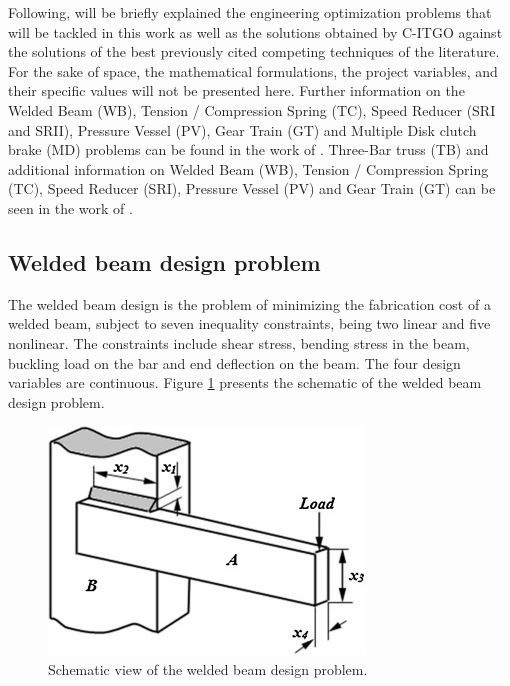 Following, will be briefly explained the engineering optimization problems that will be tackled in this work as well as the solutions obtained by C-ITGO against the solutions of the best previously cited competing techniques of the literature. For the sake of space, the mathematical formulations, the project variables, and their specific values will not be presented here. Further information on the Welded Beam (WB), Tension / Compression Spring (TC), Speed Reducer (SRI and SRII), Pressure Vessel (PV), Gear Train (GT) and Multiple Disk clutch brake (MD) problems can be found in the work of \cite{IAPSO}. Three-Bar truss (TB) and additional information on Welded Beam (WB), Tension / Compression Spring (TC), Speed Reducer (SRI), Pressure Vessel (PV) and Gear Train (GT) can be seen in the work of \cite{MBA}.



\subsection{Welded beam design problem}

The welded beam design \citep{WB} is the problem of minimizing the fabrication cost of a welded beam, subject to seven inequality constraints, being two linear and five nonlinear. The constraints include shear stress, bending stress in the beam, buckling load on the bar and end deflection on the beam. The four design variables are continuous. Figure \ref{fig:WB} presents the schematic of the welded beam design problem.

\begin{figure}[h]
\begin{center}
\includegraphics[scale=0.7]{Imgs/WB.jpg}
\end{center}
\captionsetup{justification=centering}
\caption{Schematic view of the welded beam design problem.}\label{fig:WB}
\end{figure}

